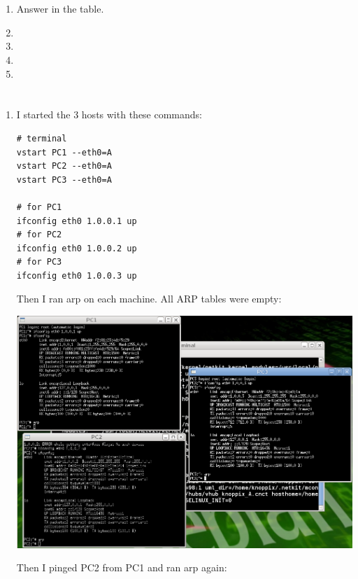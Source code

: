 \documentclass[12pt, a4paper]{article}
\begin{document}
\section{} %
\begin{enumerate}
	\item %
	Answer in the table.

	\item %
	\item %
	\item %
	\item %
\end{enumerate}

\section{} %
\begin{enumerate}[a]
	\item %
	I started the 3 hosts with these commands:
	\begin{lstlisting}
# terminal
vstart PC1 --eth0=A
vstart PC2 --eth0=A
vstart PC3 --eth0=A

# for PC1
ifconfig eth0 1.0.0.1 up
# for PC2
ifconfig eth0 1.0.0.2 up
# for PC3
ifconfig eth0 1.0.0.3 up
	\end{lstlisting}

	Then I ran arp on each machine. All ARP tables were empty:

	\includegraphics[width=\linewidth]{screenshots/screen1}

	Then I pinged PC2 from PC1 and ran arp again:


\end{enumerate}
\end{document}
